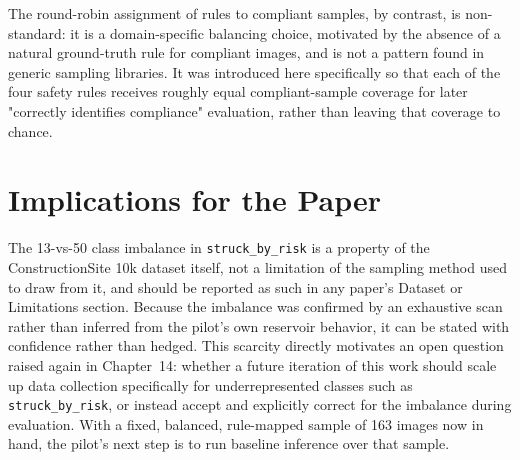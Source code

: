 The round-robin assignment of rules to compliant samples, by contrast, is non-standard: it is a
domain-specific balancing choice, motivated by the absence of a natural ground-truth rule for
compliant images, and is not a pattern found in generic sampling libraries. It was introduced here
specifically so that each of the four safety rules receives roughly equal compliant-sample coverage
for later "correctly identifies compliance" evaluation, rather than leaving that coverage to chance.

\section{Implications for the Paper}

The 13-vs-50 class imbalance in \texttt{struck\_by\_risk} is a property of the ConstructionSite 10k
dataset itself, not a limitation of the sampling method used to draw from it, and should be reported
as such in any paper's Dataset or Limitations section. Because the imbalance was confirmed by an
exhaustive scan rather than inferred from the pilot's own reservoir behavior, it can be stated with
confidence rather than hedged. This scarcity directly motivates an open question raised again in
Chapter~14: whether a future iteration of this work should scale up data collection specifically for
underrepresented classes such as \texttt{struck\_by\_risk}, or instead accept and explicitly correct
for the imbalance during evaluation. With a fixed, balanced, rule-mapped sample of 163 images now in
hand, the pilot's next step is to run baseline inference over that sample.
